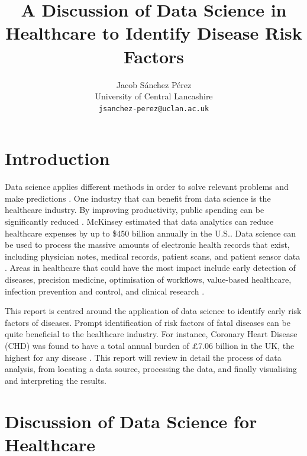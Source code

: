 \documentclass[a4paper,11pt]{article}
\title{A Discussion of Data Science in Healthcare to Identify Disease Risk Factors}
\author{Jacob Sánchez Pérez\\ University of Central Lancashire\\\texttt{jsanchez-perez@uclan.ac.uk}}
\date{}
\begin{document}
\maketitle


\section{Introduction}



Data science applies different methods in order to solve relevant problems and
make predictions \parencite[78]{Waller2013}.
One industry that can benefit from data science is the healthcare industry.
By improving productivity, public spending can be significantly reduced \parencite{oecd2010health}.
McKinsey estimated that data analytics can reduce healthcare expenses by up to
\$450 billion annually in the U.S.\parencite{Groves2013}.
Data science can be used to process the massive amounts of electronic health
records that exist, including physician notes, medical records, patient scans,
and patient sensor data \parencite{Adam2017, Dalianis2015}.
Areas in healthcare that could have the most impact include early detection of
diseases, precision medicine, optimisation of workflows, value-based healthcare,
infection prevention and control, and clinical research \parencite[9]{Consoli2019}.

This report is centred around the application of data science to identify early
risk factors of diseases.
Prompt identification of risk factors of fatal diseases can be quite beneficial
to the healthcare industry.
For instance, Coronary Heart Disease (CHD) was found to have a total annual
burden of £7.06 billion in the UK, the highest for any disease \parencite{Liu2002}.
This report will review in detail the process of data analysis, from locating a
data source, processing the data, and finally visualising and interpreting the results.

\section{Discussion of Data Science for Healthcare}

\end{document}
